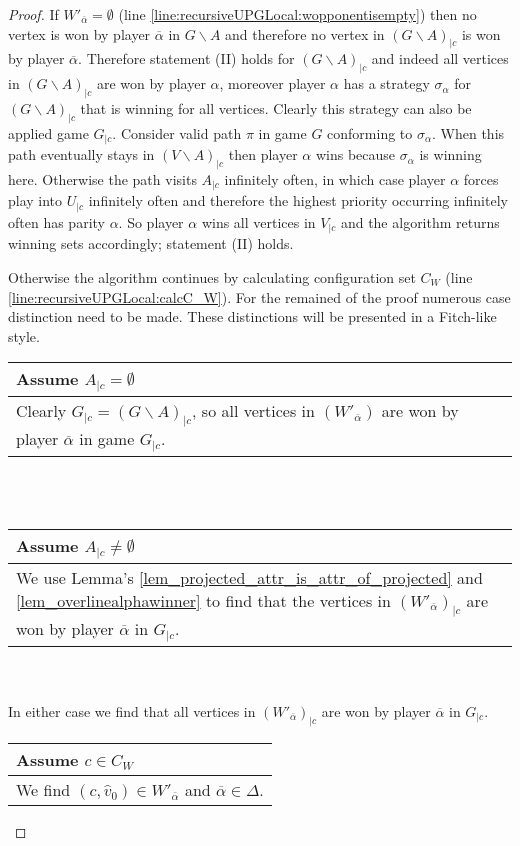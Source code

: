 \begin{theorem}
\begin{proof}
		If $W'_{\overline{\alpha}} = \emptyset$ (line \ref{line:recursiveUPGLocal:wopponentisempty}) then no vertex is won by player $\overline{\alpha}$ in $G\backslash A$ and therefore no vertex in $(G\backslash A)_{|c}$ is won by player $\overline{\alpha}$. Therefore statement (II) holds for $(G\backslash A)_{|c}$ and indeed all vertices in $(G\backslash A)_{|c}$ are won by player $\alpha$, moreover player $\alpha$ has a strategy $\sigma_\alpha$ for $(G\backslash A)_{|c}$ that is winning for all vertices. Clearly this strategy can also be applied game $G_{|c}$. Consider valid path $\pi$ in game $G$ conforming to $\sigma_\alpha$. When this path eventually stays in $(V \backslash A)_{|c}$ then player $\alpha$ wins because $\sigma_\alpha$ is winning here. Otherwise the path visits $A_{|c}$ infinitely often, in which case player $\alpha$ forces play into $U_{|c}$ infinitely often and therefore the highest priority occurring infinitely often has parity $\alpha$. So player $\alpha$ wins all vertices in $V_{|c}$ and the algorithm returns winning sets accordingly; statement (II) holds.
		
		Otherwise the algorithm continues by calculating configuration set $C_W$ (line \ref{line:recursiveUPGLocal:calcC_W}). For the remained of the proof numerous case distinction need to be made. These distinctions will be presented in a Fitch-like style.
		
		\begin{tabular}{|p{14.2cm}}
			Assume $A_{|c} = \emptyset$\\
			\hline
			Clearly $G_{|c} = (G\backslash A)_{|c}$, so all vertices in $(W'_{\overline{\alpha}})$ are won by player $\overline{\alpha}$ in game $G_{|c}$.
		\end{tabular}\\\\
		\begin{tabular}{|p{14.2cm}}
			Assume $A_{|c} \neq \emptyset$\\
			\hline
			We use Lemma's \ref{lem_projected_attr_is_attr_of_projected} and \ref{lem_overlinealphawinner} to find that the vertices in $(W'_{\overline{\alpha}})_{|c}$ are won by player $\overline{\alpha}$ in $G_{|c}$.
		\end{tabular}\\\\
		In either case we find that all vertices in $(W'_{\overline{\alpha}})_{|c}$ are won by player $\overline{\alpha}$ in $G_{|c}$.
		
		\begin{longtable}{|p{14.2cm}}
			Assume $c \in C_W$\\
			\hline
			We find $(c,\hat{v}_0) \in W'_{\overline{\alpha}}$ and $\overline{\alpha} \in \Delta$.
			

\end{longtable}
\end{proof}
\end{theorem}
